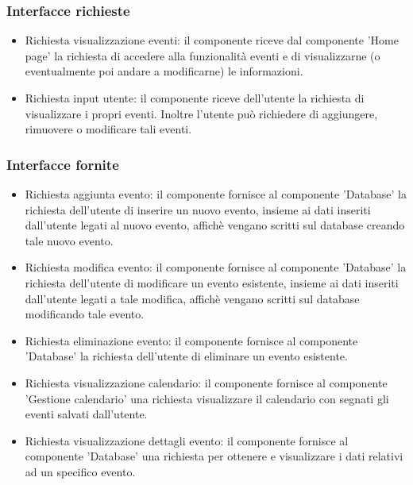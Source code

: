 \documentclass[a4paper,12pt]{article}
\begin{document}
\subsubsection*{Interfacce richieste}
\begin{itemize} \setlength\itemsep{0.01em}.
\item {\sffamily Richiesta visualizzazione eventi}: il componente riceve dal componente 'Home page'  la richiesta di accedere alla funzionalità eventi e di visualizzarne (o eventualmente poi andare a modificarne) le informazioni.
\item {\sffamily Richiesta input utente}: il componente riceve dell'utente la richiesta di visualizzare i propri eventi. Inoltre l'utente può richiedere di aggiungere, rimuovere o modificare tali eventi.

\end{itemize}

\subsubsection*{Interfacce fornite}
\begin{itemize} \setlength\itemsep{0.01em}
\item {\sffamily Richiesta aggiunta evento}: il componente fornisce al componente 'Database' la richiesta dell'utente di inserire un nuovo evento, insieme ai dati inseriti dall'utente legati al nuovo evento, affichè vengano scritti sul database creando tale nuovo evento.
\item {\sffamily Richiesta modifica evento}: il componente fornisce al componente 'Database'  la richiesta dell'utente di modificare un evento esistente, insieme ai dati inseriti dall'utente legati a tale modifica, affichè vengano scritti sul database modificando tale evento.
\item {\sffamily Richiesta eliminazione evento}: il componente fornisce al componente 'Database'  la richiesta dell'utente di eliminare un evento esistente.
\item {\sffamily Richiesta visualizzazione calendario}: il componente fornisce al componente 'Gestione calendario' una richiesta visualizzare il calendario con segnati gli eventi salvati dall'utente.
\item {\sffamily Richiesta visualizzazione dettagli evento}: il componente fornisce al componente 'Database' una richiesta per ottenere e visualizzare i dati relativi ad un specifico evento.
\end{itemize}
\end{document}

